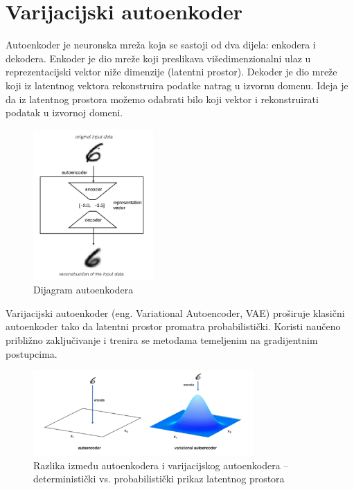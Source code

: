 \documentclass[times, utf8, seminar, numeric]{fer}
\begin{document}
		\section{Varijacijski autoenkoder}
		Autoenkoder je neuronska mreža koja se sastoji od dva dijela: enkodera i dekodera. Enkoder je dio mreže koji preslikava višedimenzionalni ulaz u reprezentacijski vektor niže dimenzije (latentni prostor). Dekoder je dio mreže koji iz latentnog vektora rekonstruira podatke natrag u izvornu domenu. Ideja je da iz latentnog prostora možemo odabrati bilo koji vektor i rekonstruirati podatak u izvornoj domeni.
		
		\begin{figure}[H]
			\centering
			\includegraphics[width=130pt]{images/VAE/diagram_autoenc.png}
			\caption{Dijagram autoenkodera \cite{foster2019generative}}
			\label{fig:VAE}
		\end{figure}
		
		Varijacijski autoenkoder (eng. Variational Autoencoder, VAE) proširuje klasični autoenkoder tako da latentni prostor promatra probabilistički. Koristi naučeno približno zaključivanje i trenira se metodama temeljenim na gradijentnim postupcima. 
		
		\begin{figure}[H]
			\centering
			\includegraphics[width=0.75\textwidth]{images/VAE/ae_vs_vae.png}
			\caption{Razlika između autoenkodera i varijacijskog autoenkodera – deterministički vs. probabilistički prikaz latentnog prostora \cite{foster2019generative}}
			\label{fig:ae_vs_vae}
		\end{figure}
		
\end{document}
